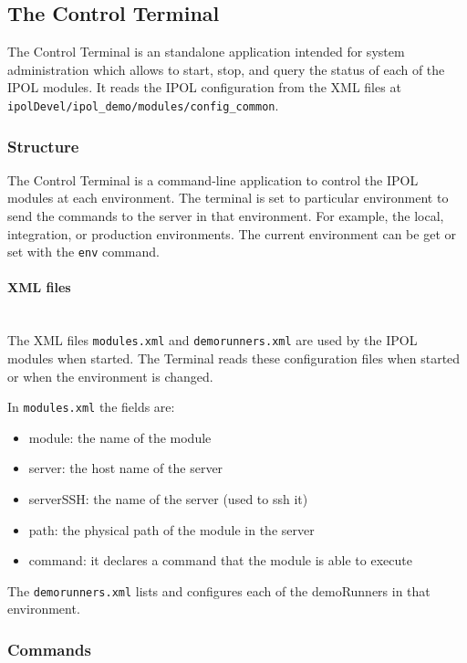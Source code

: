 \subsection{The Control Terminal}

The Control Terminal is an standalone application intended for system administration which allows to start, stop, and query the status of each of the IPOL modules. It reads the IPOL configuration from the XML files at {\tt ipolDevel/ipol\_demo/modules/config\_common}.

\subsubsection{Structure}
The Control Terminal is a command-line application to control the IPOL modules at each environment. The terminal is set to particular environment to send the commands to the server in that environment. For example, the local, integration, or production environments. The current environment can be get or set with the {\tt env} command.

\paragraph{XML files} \hspace{0pt} \\
The XML files {\tt modules.xml} and {\tt demorunners.xml} are used by the IPOL modules when started. The Terminal reads these configuration files when started or when the environment is changed.

In {\tt modules.xml} the fields are:
\begin{itemize}
    \item module: the name of the module
    \item server: the host name of the server
    \item serverSSH: the name of the server (used to ssh it)
    \item path: the physical path of the module in the server
    \item command: it declares a command that the module is able to execute
\end{itemize}

The {\tt demorunners.xml} lists and configures each of the demoRunners in that environment.

\subsubsection{Commands}
